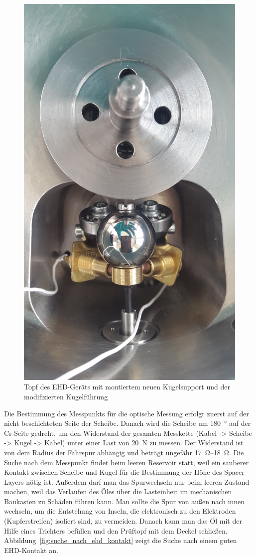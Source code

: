 \begin{figure}[htb]
    \centering
    \includegraphics[width=0.7\linewidth]{./images/ehd_topf_mit_kugel_und_support.jpg}
    \caption{Topf des EHD-Geräts mit montiertem neuen Kugelsupport und der modifizierten Kugelführung}
    \label{fig:ehd_topf_mit_kugel_und_support}
\end{figure}

Die Bestimmung des Messpunkts für die optische Messung erfolgt zuerst auf der nicht beschichteten Seite der Scheibe.
Danach wird die Scheibe um \SI{180}{\degree} auf der Cr-Seite gedreht, um den Widerstand der gesamten Messkette (Kabel -> Scheibe -> Kugel -> Kabel) unter einer Last von \SI{20}{\newton} zu messen.
Der Widerstand ist von dem Radius der Fahrspur abhängig und beträgt ungefähr \SIrange{17}{18}{\ohm}.
Die Suche nach dem Messpunkt findet beim leeren Reservoir statt, weil ein sauberer Kontakt zwischen Scheibe und Kugel für die Bestimmung der Höhe des Spacer-Layers nötig ist.
Außerdem darf man das Spurwechseln nur beim leeren Zustand machen, weil das Verlaufen des Öles über die Lasteinheit im mechanischen Baukasten zu Schäden führen kann.
Man sollte die Spur von außen nach innen wechseln, um die Entstehung von Inseln, die elektronisch zu den Elektroden (Kupferstreifen) isoliert sind, zu vermeiden.
Danach kann man das Öl mit der Hilfe eines Trichters befüllen und den Prüftopf mit dem Deckel schließen.
Abbildung~\ref{fig:suche_nach_ehd_kontakt} zeigt die Suche nach einem guten EHD-Kontakt an.

